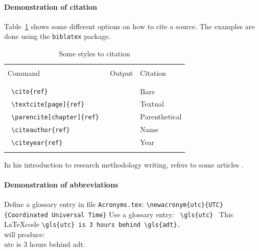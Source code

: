 \paragraph{Demonstration of citation}
Table~\ref{tbl:CitationStyles} shows some different options on how to cite a source. 
The examples are done using the \texttt{biblatex} package.
\begin{table}[H]
	\begin{center}
		\caption{\label{tbl:CitationStyles}Some styles to citation}
		\begin{tabular}{lll}
			\hline \\
			Command & 	Output	& Citation \\
			\\
			\hline \\
			\verb! \cite{ref} ! & \cite{Monippally2010} & Bare\\
			\verb! \textcite[page]{ref} ! & \textcite[p. 20]{Monippally2010} & Textual\\
			\verb! \parencite[chapter]{ref} ! & \parencite[chap. 4]{Monippally2010} & Parenthetical\\
			
			\verb! \citeauthor{ref} ! & \citeauthor{Monippally2010} & Name\\
			\verb! \citeyear{ref} ! & \citeyear{Monippally2010} & Year\\
			\hline \\
		\end{tabular}  
	\end{center}
\end{table}
In his introduction to research methodology writing, \citeauthor{Bouchrika2020} refers to some articles \cite{Bouchrika2020,Choy2014,Holden2004}.

\paragraph{Demonstration of abbreviations}
Define a glossary entry in file \texttt{Acronyms.tex}:
\newline
\verb!\newacronym{utc}{UTC}{Coordinated Universal Time}!
\newline
Use a glossary entry: \verb! \gls{utc} !
\newline
This \LaTeX code \verb*|\gls{utc} is 3 hours behind \gls{adt}.| \\
will produce: \\
\gls{utc} is 3 hours behind \gls{adt}.\\

